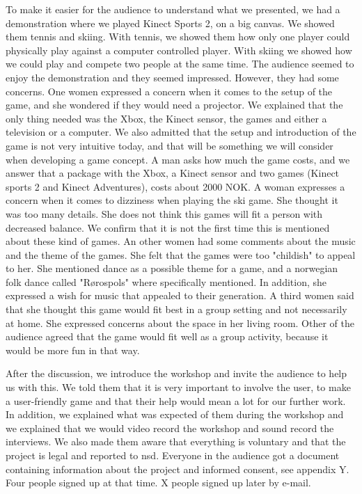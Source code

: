 To make it easier for the audience to understand what we presented, we had a demonstration where we played Kinect Sports 2, on a big canvas. We showed them tennis and skiing. With tennis, we showed them how only one player could physically play against a computer controlled player. With skiing we showed how we could play and compete two people at the same time. The audience seemed to enjoy the demonstration and they seemed impressed. However, they had some concerns. One women expressed a concern when it comes to the setup of the game, and she wondered if they would need a projector. We explained that the only thing needed was the Xbox, the Kinect sensor, the games and either a television or a computer. We also admitted that the setup and introduction of the game is not very intuitive today, and that will be something we will consider when developing a game concept. A man asks how much the game costs, and we answer that a package with the Xbox, a Kinect sensor and two games (Kinect sports 2 and Kinect Adventures), costs about 2000 NOK. A woman expresses a concern when it comes to dizziness when playing the ski game. She thought it was too many details. She does not think this games will fit a person with decreased balance. We confirm that it is not the first time this is mentioned about these kind of games. An other women had some comments about the music and the theme of the games. She felt that the games were too "childish" to appeal to her. She mentioned dance as a possible theme for a game, and a norwegian folk dance called "Rørospols" where specifically mentioned. In addition, she expressed a wish for music that appealed to their generation. A third women said that she thought this game would fit best in a group setting and not necessarily at home. She expressed concerns about the space in her living room. Other of the audience agreed that the game would fit well as a group activity, because it would be more fun in that way.

After the discussion, we introduce the workshop and invite the audience to help us with this. We told them that it is very important to involve the user, to make a user-friendly game and that their help would mean a lot for our further work. In addition, we explained what was expected of them during the workshop and we explained that we would video record the workshop and sound record the interviews. We also made them aware that everything is voluntary and that the project is legal and reported to \ac{nsd}. Everyone in the audience got a document containing information about the project and informed consent, see appendix Y. Four people signed up at that time. X people signed up later by e-mail.

